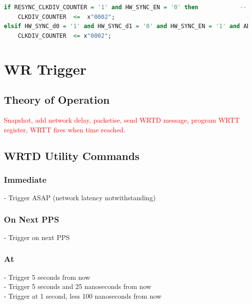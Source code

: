 \documentclass[]{article}
\begin{document}
\begin{center}\begin{lstlisting}[language=vhdl,style=hdlstyle]
if RESYNC_CLKDIV_COUNTER = '1' and HW_SYNC_EN = '0' then            -- Reset counter when Trigger Divider Synchronisation is detected disable when using PPS sync
	CLKDIV_COUNTER  <=  x"0002";                                      -- 1 clk_SEL pipeline for Trigger Divider Synchronisation
elsif HW_SYNC_d0 = '1' and HW_SYNC_d1 = '0' and HW_SYNC_EN = '1' and ADC_ENABLE = '0' then  -- Preload pipeline on PPS and Before running the ADC
	CLKDIV_COUNTER  <= x"0002";
\end{lstlisting}\end{center}

\section{WR Trigger}
\subsection{Theory of Operation}
\textcolor{red}{Snapshot, add network delay, packetise, send WRTD message, program WRTT register, WRTT fires when time reached.}

\subsection{WRTD Utility Commands}

\subsubsection{Immediate}
 - Trigger ASAP (network latency notwithstanding)
\subsubsection{On Next PPS}
 - Trigger on next PPS
\subsubsection{At}
 - Trigger 5 seconds from now\\
 - Trigger 5 seconds and 25 nanoseconds from now\\
 - Trigger at 1 second, less 100 nanoseconds from now
\end{document}
